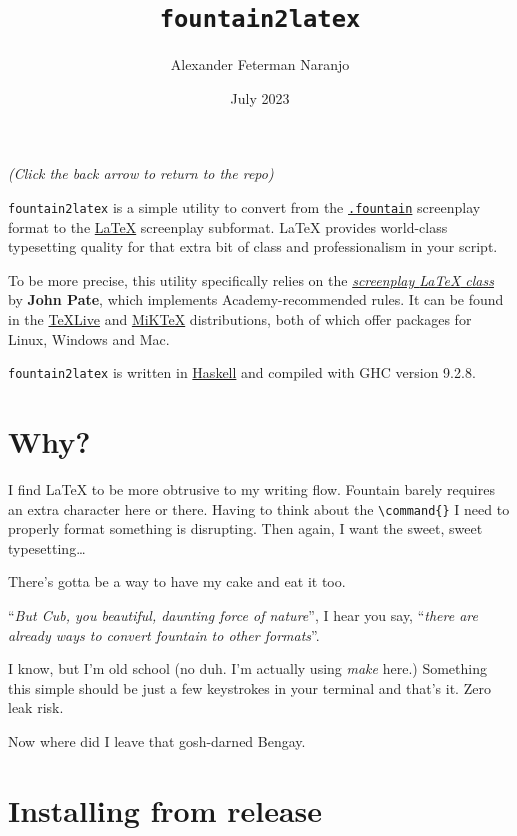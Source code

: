 \documentclass[11pt]{article}
\author{Alexander Feterman Naranjo}
\date{July 2023}
\title{\textbf{\texttt{fountain2latex}}}
\newcommand{\link}[2]{\textcolor{Blue}{\href{#1}{#2}}}
\begin{document}
\maketitle

\begin{center}
\scriptsize{\emph{(Click the back arrow to return to the repo)}}
\end{center}

\texttt{fountain2latex} is a simple utility to convert from the
\texttt{\link{https://fountain.io/}{.fountain}} screenplay format to
the \link{https://www.latex-project.org/}{\LaTeX} screenplay subformat.
{\LaTeX} provides world-class typesetting quality for that extra bit of
class and professionalism in your script.

To be more precise, this utility specifically relies on the
\emph{\link{https://www.ctan.org/pkg/screenplay}{screenplay {\LaTeX} class}}
by \textbf{John Pate}, which implements Academy-recommended rules. It can be
found in the \link{https://tug.org/texlive/}{TeXLive} and
\link{https://miktex.org/}{MiKTeX} distributions, both of which offer
packages for Linux, Windows and Mac.

\texttt{fountain2latex} is written in \link{https://haskell.org}{Haskell}
and compiled with GHC version 9.2.8.


\section*{Why?}

I find {\LaTeX} to be more obtrusive to my writing flow. Fountain barely
requires an extra character here or there. Having to think about the
\verb|\command{}| I need to properly format something is disrupting.
Then again, I want the sweet, sweet typesetting{\ldots}

There's gotta be a way to have my cake and eat it too.

``\emph{But Cub, you beautiful, daunting force of nature}'', I hear you say,
``\emph{there are already ways to convert fountain to other formats}''.

I know, but I'm old school (no duh. I'm actually using \emph{make} here.)
Something this simple should be just a few keystrokes in your terminal and
that's it. Zero leak risk.

Now where did I leave that gosh-darned Bengay.


\section*{Installing from release}
\end{document}
